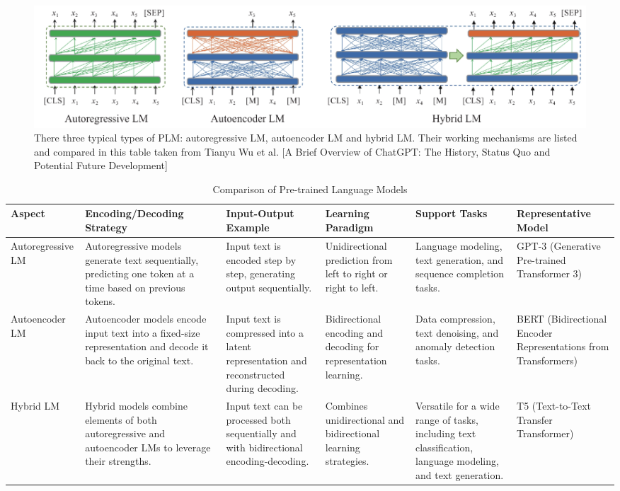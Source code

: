 \documentclass[conference]{IEEEtran}
\begin{document}
\begin{figure}
    \centering
    \includegraphics[width=\textwidth]{LMTYPES}
    \caption{There three typical types of PLM: autoregressive LM, autoencoder LM and hybrid LM. Their working mechanisms are listed and compared in this
table taken from Tianyu Wu et al. [A Brief Overview of ChatGPT: The History, Status Quo and Potential Future Development]}
    \label{fig:your_image_label}
\end{figure}


\begin{table}
    \centering
    \caption{Comparison of Pre-trained Language Models}
    \begin{tabular}{|p{2cm}|p{3cm}|p{3cm}|p{2cm}|p{2cm}|p{2 cm}|}
        \hline
\center
        \textbf{Aspect} & \textbf{Encoding/Decoding Strategy} & \textbf{Input-Output Example} & \textbf{Learning Paradigm} & \textbf{Support Tasks} & \textbf{Representative Model} \\
        \hline
\center
        Autoregressive LM & Autoregressive models generate text sequentially, predicting one token at a time based on previous tokens. & Input text is encoded step by step, generating output sequentially. & Unidirectional prediction from left to right or right to left. & Language modeling, text generation, and sequence completion tasks. & GPT-3 (Generative Pre-trained Transformer 3) \\
        \hline
\center
        Autoencoder LM & Autoencoder models encode input text into a fixed-size representation and decode it back to the original text. & Input text is compressed into a latent representation and reconstructed during decoding. & Bidirectional encoding and decoding for representation learning. & Data compression, text denoising, and anomaly detection tasks. & BERT (Bidirectional Encoder Representations from Transformers) \\
        \hline
\center
        Hybrid LM & Hybrid models combine elements of both autoregressive and autoencoder LMs to leverage their strengths. & Input text can be processed both sequentially and with bidirectional encoding-decoding. & Combines unidirectional and bidirectional learning strategies. & Versatile for a wide range of tasks, including text classification, language modeling, and text generation. & T5 (Text-to-Text Transfer Transformer) \\
        \hline
    \end{tabular}
\end{table}
\end{document}
